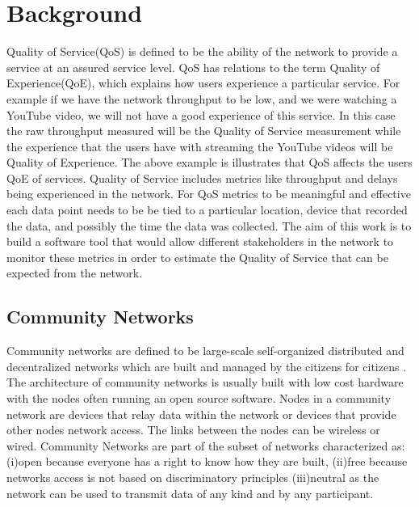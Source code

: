 \section{Background}\label{sec:background}
Quality of Service(QoS) is defined to be the ability of the network to provide a service at an assured service level\cite{soldani_book}.
QoS has relations to the term Quality of Experience(QoE), which explains how users experience a particular service\cite{6462223}.
For example if we have the network throughput to be low, and we were watching a YouTube video, we will not have a good experience of this service.
In this case the raw throughput measured will be the Quality of Service measurement while the experience that the users have with streaming the YouTube videos will be Quality of Experience.
The above example is illustrates that QoS affects the users QoE of services.
Quality of Service includes metrics like throughput and delays being experienced in the network.
For QoS metrics to be meaningful and effective each data point needs to be be tied to a particular location, device that recorded the data, and possibly the time the data was collected.
The aim of this work is to build a software tool that would allow different stakeholders in the network to monitor these metrics in order to estimate the Quality of Service that can be expected from the network.
\subsection{Community Networks}\label{subsec:community-networks}
Community networks are defined to be large-scale self-organized distributed and decentralized networks which are built and managed by the citizens for citizens \cite{Braem:2013:CRC:2500098.2500108}.
The architecture of community networks is usually built with low cost hardware with the nodes often running an open source software\cite{Braem:2013:CRC:2500098.2500108}.
Nodes in a community network are devices that relay data within the network or devices that provide other nodes network access\cite{8320771}.
The links between the nodes can be wireless or wired\cite{8320771}.
Community Networks are part of the subset of networks characterized as:
(i)open because everyone has a right to know how they are built,
(ii)free because networks access is not based on discriminatory principles
(iii)neutral as the network can be used to transmit data of any kind and by any participant\cite{Braem:2015:AEQ:2830629.2830639}.

